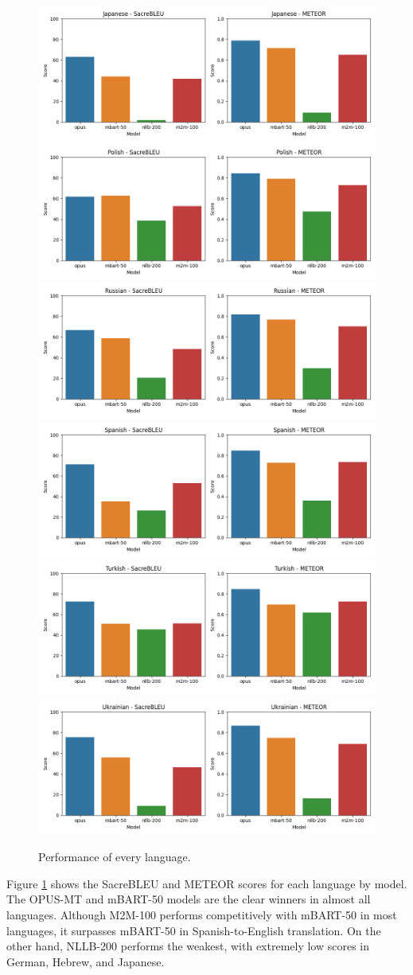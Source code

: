 \documentclass[a4paper]{article}
\begin{document}
\begin{figure}[htbp]
    \includegraphics[width=0.49\linewidth]{figures/japanese_all_metrics.png}
    \includegraphics[width=0.49\linewidth]{figures/polish_all_metrics.png}
    \includegraphics[width=0.49\linewidth]{figures/russian_all_metrics.png}
    \includegraphics[width=0.49\linewidth]{figures/spanish_all_metrics.png}
    \includegraphics[width=0.49\linewidth]{figures/turkish_all_metrics.png}
    \includegraphics[width=0.49\linewidth]{figures/ukrainian_all_metrics.png}
    \caption{Performance of every language.}
    \label{fig:lang_metrics}
\end{figure}

Figure \ref{fig:lang_metrics} shows the SacreBLEU and METEOR scores for each language by model. The OPUS-MT and mBART-50 models are the clear winners in almost all languages. Although M2M-100 performs competitively with mBART-50 in most languages, it surpasses mBART-50 in Spanish-to-English translation. On the other hand, NLLB-200 performs the weakest, with extremely low scores in German, Hebrew, and Japanese.
\end{document}
